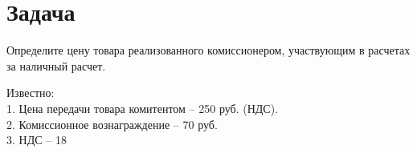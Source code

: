 \section{Задача}
Определите цену товара реализованного комиссионером,
участвующим в расчетах за наличный расчет.

Известно:\\
1. Цена передачи товара комитентом – 250 руб. (НДС).\\
2. Комиссионное вознаграждение – 70 руб.\\
3. НДС – 18%
